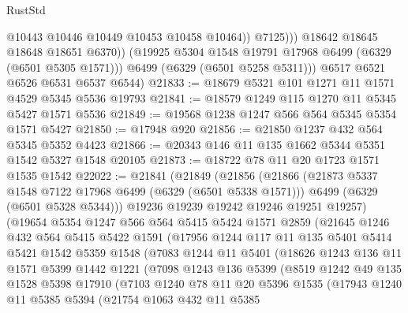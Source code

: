 \begin{lexlean}{RustStd}
\begin{coremodule}
{{                      @10443
                      @10446
                      @10449
                      @10453
                      @10458
                      @10464))
                  @7125)))
            @18642
            @18645
            @18648
            @18651
            @6370))
        (@19925 @5304 @1548 @19791 @17968 @6499 (@6329 (@6501 @5305 @1571)))
        @6499
        (@6329 (@6501 @5258 @5311)))
      @6517
      @6521
      @6526
      @6531
      @6537
      @6544)
@21833 := @18679 @5321 @101 @1271 @11 @1571 @4529 @5345 @5536 @19793
@21841 := @18579 @1249 @115 @1270 @11 @5345 @5427 @1571 @5536
@21849 := @19568 @1238 @1247 @566 @564 @5345 @5354 @1571 @5427
@21850 := @17948 @920
@21856 := @21850 @1237 @432 @564 @5345 @5352 @4423
@21866 := @20343 @146 @11 @135 @1662 @5344 @5351 @1542 @5327 @1548 @20105
@21873 := @18722 @78 @11 @20 @1723 @1571 @1535 @1542
@22022 := @21841
    (@21849
      (@21856
        (@21866
          (@21873 @5337 @1548 @7122 @17968 @6499 (@6329 (@6501 @5338 @1571)))
          @6499
          (@6329 (@6501 @5328 @5344)))
        @19236
        @19239
        @19242
        @19246
        @19251
        @19257)
      (@19654
        @5354
        @1247
        @566
        @564
        @5415
        @5424
        @1571
        @2859
        (@21645
          @1246
          @432
          @564
          @5415
          @5422
          @1591
          (@17956
            @1244
            @117
            @11
            @135
            @5401
            @5414
            @5421
            @1542
            @5359
            @1548
            (@7083
              @1244
              @11
              @5401
              (@18626
                @1243
                @136
                @11
                @1571
                @5399
                @1442
                @1221
                (@7098
                  @1243
                  @136
                  @5399
                  (@8519
                    @1242
                    @49
                    @135
                    @1528
                    @5398
                    @17910
                    (@7103
                      @1240
                      @78
                      @11
                      @20
                      @5396
                      @1535
                      (@17943
                        @1240
                        @11
                        @5385
                        @5394
                        (@21754
                          @1063
                          @432
                          @11
                          @5385
}}
\end{coremodule}
\end{lexlean}
